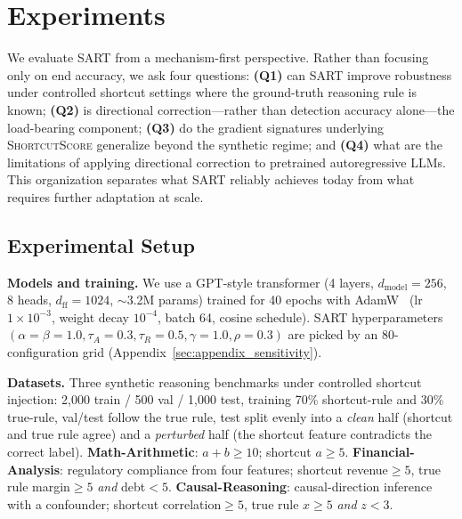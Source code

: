 \section{Experiments}
\label{sec:experiments}

We evaluate SART from a mechanism-first perspective. Rather than focusing only on end accuracy, we ask four questions: \textbf{(Q1)} can SART improve robustness under controlled shortcut settings where the ground-truth reasoning rule is known; \textbf{(Q2)} is directional correction---rather than detection accuracy alone---the load-bearing component; \textbf{(Q3)} do the gradient signatures underlying \textsc{ShortcutScore} generalize beyond the synthetic regime; and \textbf{(Q4)} what are the limitations of applying directional correction to pretrained autoregressive LLMs. This organization separates what SART reliably achieves today from what requires further adaptation at scale.

\subsection{Experimental Setup}
\label{sec:exp_setup}

\textbf{Models and training.} We use a GPT-style transformer (4 layers, $d_{\mathrm{model}}=256$, 8 heads, $d_{\mathrm{ff}}=1024$, $\sim$3.2M params) trained for 40 epochs with AdamW~\cite{loshchilov2019decoupled} (lr $1\!\times\!10^{-3}$, weight decay $10^{-4}$, batch 64, cosine schedule). SART hyperparameters $(\alpha=\beta=1.0,\tau_A=0.3,\tau_R=0.5,\gamma=1.0,\rho=0.3)$ are picked by an 80-configuration grid (Appendix~\ref{sec:appendix_sensitivity}).

\textbf{Datasets.} Three synthetic reasoning benchmarks under controlled shortcut injection: 2{,}000 train / 500 val / 1{,}000 test, training 70\% shortcut-rule and 30\% true-rule, val/test follow the true rule, test split evenly into a \emph{clean} half (shortcut and true rule agree) and a \emph{perturbed} half (the shortcut feature contradicts the correct label). \textbf{Math-Arithmetic}: $a{+}b{\geq}10$; shortcut $a{\geq}5$. \textbf{Financial-Analysis}: regulatory compliance from four features; shortcut revenue${\geq}5$, true rule margin${\geq}5$ \emph{and} debt${<}5$. \textbf{Causal-Reasoning}: causal-direction inference with a confounder; shortcut correlation${\geq}5$, true rule $x{\geq}5$ \emph{and} $z{<}3$.

